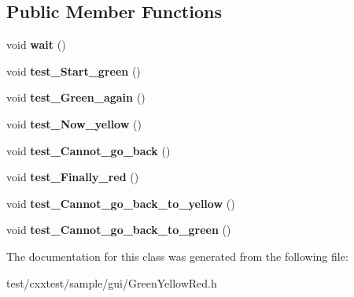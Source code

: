 \subsection*{Public Member Functions}
\begin{DoxyCompactItemize}
\item 
\hypertarget{classGreenYellowRed_ae70fe6519bb1b030364264a0d1a14c12}{void {\bfseries wait} ()}\label{classGreenYellowRed_ae70fe6519bb1b030364264a0d1a14c12}

\item 
\hypertarget{classGreenYellowRed_a7802af3b95a996ae9a40ad2481c7fc12}{void {\bfseries test\-\_\-\-Start\-\_\-green} ()}\label{classGreenYellowRed_a7802af3b95a996ae9a40ad2481c7fc12}

\item 
\hypertarget{classGreenYellowRed_af7627c501fb20c9215392d2e3db17133}{void {\bfseries test\-\_\-\-Green\-\_\-again} ()}\label{classGreenYellowRed_af7627c501fb20c9215392d2e3db17133}

\item 
\hypertarget{classGreenYellowRed_a27576d8441b456243ba90958e039b045}{void {\bfseries test\-\_\-\-Now\-\_\-yellow} ()}\label{classGreenYellowRed_a27576d8441b456243ba90958e039b045}

\item 
\hypertarget{classGreenYellowRed_ac9ffe9de3e6f7341730ba50ab2dda316}{void {\bfseries test\-\_\-\-Cannot\-\_\-go\-\_\-back} ()}\label{classGreenYellowRed_ac9ffe9de3e6f7341730ba50ab2dda316}

\item 
\hypertarget{classGreenYellowRed_a894149080d286fe17bf4e2da54dd0a88}{void {\bfseries test\-\_\-\-Finally\-\_\-red} ()}\label{classGreenYellowRed_a894149080d286fe17bf4e2da54dd0a88}

\item 
\hypertarget{classGreenYellowRed_a83fc1d28ea3ce81a8b17313b710e4933}{void {\bfseries test\-\_\-\-Cannot\-\_\-go\-\_\-back\-\_\-to\-\_\-yellow} ()}\label{classGreenYellowRed_a83fc1d28ea3ce81a8b17313b710e4933}

\item 
\hypertarget{classGreenYellowRed_a63f90a43b51ad0d361bcfd8f4e9e4377}{void {\bfseries test\-\_\-\-Cannot\-\_\-go\-\_\-back\-\_\-to\-\_\-green} ()}\label{classGreenYellowRed_a63f90a43b51ad0d361bcfd8f4e9e4377}

\end{DoxyCompactItemize}


The documentation for this class was generated from the following file\-:\begin{DoxyCompactItemize}
\item 
test/cxxtest/sample/gui/Green\-Yellow\-Red.\-h\end{DoxyCompactItemize}
